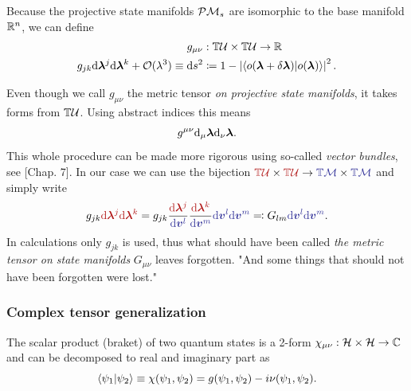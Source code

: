 \begin{definition}
Because the projective state manifolds $\mathcal{P}\mathcal{M}_s$ are isomorphic to the base manifold $\mathbb{R}^n$, we can define
    \begin{equation}
        \begin{split}
            g_{\mu\nu}&: \mathbb{T}\mathcal U\times \mathbb{T}\mathcal U\rightarrow \mathbb{R} \\
            g_{jk}\mathrm{d} \bm \lambda^j \mathrm{d}\bm \lambda^k+\mathcal{O}(\lambda^3) \equiv \mathrm{d} s^2 &\coloneqq 1-\left|\braket{o(\bm{{\bm\lambda}}+\delta\bm{{\bm\lambda}})|o(\bm{{\bm\lambda}})}\right|^2.
            \label{eq:metricTensorDef}
        \end{split}
    \end{equation} 
   
\end{definition}
Even though we call $g_{\mu\nu}$ the metric tensor \emph{on projective state manifolds}, it takes forms from $\mathbb{T}\mathcal U$. Using abstract indices this means
\begin{equation}
    g^{\mu\nu}\mathrm{d}_\mu {\bm\lambda} \mathrm{d}_\nu {\bm\lambda}.
\end{equation}
This whole procedure can be made more rigorous using so-called \emph{vector bundles}, see \cite{lu}[Chap. 7]. In our case we can use the bijection $\redd{\T\mathcal U}\times \redd{\T\mathcal U} \rightarrow \bluee{\T\M}\times \bluee{\T\M}$ and simply write
\begin{equation}
    g_{jk}\redd{\d\llambda^j \d\llambda^k} = g_{jk}\frac{\redd{\d\llambda^j}}{\bluee{\d\bm v^l}}\frac{\redd{\d\llambda^k}}{\bluee{\d\bm v^m}} \bluee{\d\bm v^l \d \bm v^m} \eqqcolon G_{lm}\bluee{\d\bm v^l \d \bm v^m}.
\end{equation}
In calculations only $g_{jk}$ is used, thus what should have been called \emph{the metric tensor on state manifolds} $G_{\mu\nu}$ leaves forgotten. "And some things that should not have been forgotten were lost." \citep{lordOfTheRings}







\subsubsection{Complex tensor generalization}
The scalar product (braket) of two quantum states is a 2-form $\chi_{\mu\nu}: \mathcal{H}\times\mathcal{H}\rightarrow \mathbb{C}$ and can be decomposed to real and imaginary part as
\begin{equation}
    \braket{\psi_1|\psi_2}\equiv \chi(\psi_1,\psi_2)=g(\psi_1,\psi_2)-i\nu(\psi_1,\psi_2).
    \label{eq:quantumProd}
\end{equation}

